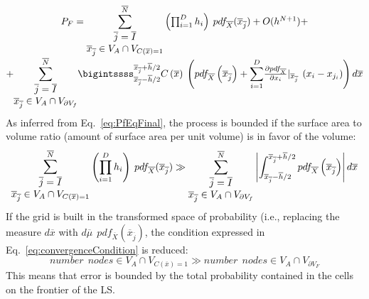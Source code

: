  \begin{equation}
 \label{eq:PfEqFinal}
 \begin{matrix}
P_{F} = \mathlarger{\sum}_{\begin{matrix}
\overline{j}=\overline{I} \\ \overline{x}_{\overline{j}} \in V_{A} \cap 
V_{C(\overline{x})=1} \end{matrix}}^{\overline{N}} 
\left ( \prod_{i=1}^{D} 
 h_{i} \right ) 
\: pdf_{\overline{X}} ( \overline{x}_{\overline{j}}) + O(h^{N+1}) +
 \\
 + \mathlarger{\sum}_{\begin{matrix}
\overline{j}=\overline{I} \\ \overline{x}_{\overline{j}} \in V_{A} \cap 
V_{\partial V_{f}} \end{matrix}}^{\overline{N}}
\bigintssss_{\overline{x}_{\overline{j}} - 
\overline{h}/2}^{\overline{x}_{\overline{j}} + \overline{h}/2} C\left ( 
\overline{x} \right )\: \left ( pdf_{\overline{X}}\left ( 
\overline{x}_{\overline{j}} \right ) +
\mathlarger{\sum}_{i=1}^{D} \frac{\partial pdf_{\overline{X}}}{\partial 
x_{i}}|_{\overline{x}_{\overline{j}}} \: \left ( x_{i} - x_{j_{i}} \right ) \right )   
d\overline{x}
\end{matrix} 
 \end{equation} 
As inferred from Eq.~\ref{eq:PfEqFinal}, the process is bounded if the 
surface area to volume ratio (amount of surface area per unit volume) is 
in favor of the volume:
\begin{equation}
\label{eq:convergenceCondition}
\mathlarger{\sum}_{\begin{matrix}
\overline{j}=\overline{I} \\ \overline{x}_{\overline{j}} \in V_{A} \cap 
V_{C(\overline{x})=1} \end{matrix}}^{\overline{N}} 
\left ( \prod_{i=1}^{D} 
 h_{i} \right ) 
\: pdf_{\overline{X}} ( \overline{x}_{\overline{j}})
\gg 
\sum_{\begin{matrix}
\overline{j}=\overline{I} \\ \overline{x}_{\overline{j}} \in V_{A} \cap 
V_{\partial V_{f}} \end{matrix}}^{\overline{N}}
\left | \int_{\overline{x}_{\overline{j}} - 
\overline{h}/2}^{\overline{x}_{\overline{j}} + \overline{h}/2}   pdf_{\overline{X}}\left ( 
\overline{x}_{\overline{j}} \right )  \right |
d\overline{x}
\end{equation}
If the grid is built in the transformed space of probability (i.e., replacing the measure $d\overline{x}$ with $d \overline{\mu }\: \: pdf_{\overline{X}}\left ( \overline{x}_{\overline{j}} \right )$, the condition expressed in Eq.~\ref{eq:convergenceCondition} is reduced:
\begin{equation}
number \: \:  nodes \in V_{A} \cap V_{C(\overline{x})=1} \gg number \: \:  nodes  \in V_{A} \cap V_{\partial V_{F}}
\end{equation}
This means that error is bounded by the total probability contained in the cells on the frontier of the LS.

